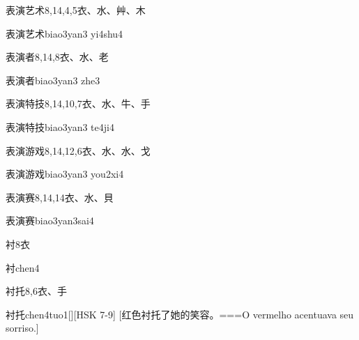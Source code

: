 \begin{Entry}{表演艺术}{8,14,4,5}{⾐、⽔、⾋、⽊}
  \begin{Phonetics}{表演艺术}{biao3yan3 yi4shu4}
  \end{Phonetics}
\end{Entry}

\begin{Entry}{表演者}{8,14,8}{⾐、⽔、⽼}
  \begin{Phonetics}{表演者}{biao3yan3 zhe3}
  \end{Phonetics}
\end{Entry}

\begin{Entry}{表演特技}{8,14,10,7}{⾐、⽔、⽜、⼿}
  \begin{Phonetics}{表演特技}{biao3yan3 te4ji4}
  \end{Phonetics}
\end{Entry}

\begin{Entry}{表演游戏}{8,14,12,6}{⾐、⽔、⽔、⼽}
  \begin{Phonetics}{表演游戏}{biao3yan3 you2xi4}
  \end{Phonetics}
\end{Entry}

\begin{Entry}{表演赛}{8,14,14}{⾐、⽔、⾙}
  \begin{Phonetics}{表演赛}{biao3yan3sai4}
  \end{Phonetics}
\end{Entry}

\begin{Entry}{衬}{8}{⾐}
  \begin{Phonetics}{衬}{chen4}
  \end{Phonetics}
\end{Entry}

\begin{Entry}{衬托}{8,6}{⾐、⼿}
  \begin{Phonetics}{衬托}{chen4tuo1}[][HSK 7-9]
    [红色衬托了她的笑容。===O vermelho acentuava seu sorriso.]
  \end{Phonetics}
\end{Entry}

